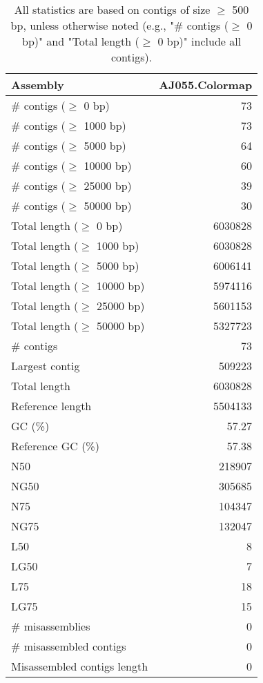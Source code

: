\documentclass[12pt,a4paper]{article}
\begin{document}
\begin{table}[ht]
\begin{center}
\caption{All statistics are based on contigs of size $\geq$ 500 bp, unless otherwise noted (e.g., "\# contigs ($\geq$ 0 bp)" and "Total length ($\geq$ 0 bp)" include all contigs).}
\begin{tabular}{|l*{1}{|r}|}
\hline
Assembly & AJ055.Colormap \\ \hline
\# contigs ($\geq$ 0 bp) & 73 \\ \hline
\# contigs ($\geq$ 1000 bp) & 73 \\ \hline
\# contigs ($\geq$ 5000 bp) & 64 \\ \hline
\# contigs ($\geq$ 10000 bp) & 60 \\ \hline
\# contigs ($\geq$ 25000 bp) & 39 \\ \hline
\# contigs ($\geq$ 50000 bp) & 30 \\ \hline
Total length ($\geq$ 0 bp) & 6030828 \\ \hline
Total length ($\geq$ 1000 bp) & 6030828 \\ \hline
Total length ($\geq$ 5000 bp) & 6006141 \\ \hline
Total length ($\geq$ 10000 bp) & 5974116 \\ \hline
Total length ($\geq$ 25000 bp) & 5601153 \\ \hline
Total length ($\geq$ 50000 bp) & 5327723 \\ \hline
\# contigs & 73 \\ \hline
Largest contig & 509223 \\ \hline
Total length & 6030828 \\ \hline
Reference length & 5504133 \\ \hline
GC (\%) & 57.27 \\ \hline
Reference GC (\%) & 57.38 \\ \hline
N50 & 218907 \\ \hline
NG50 & 305685 \\ \hline
N75 & 104347 \\ \hline
NG75 & 132047 \\ \hline
L50 & 8 \\ \hline
LG50 & 7 \\ \hline
L75 & 18 \\ \hline
LG75 & 15 \\ \hline
\# misassemblies & 0 \\ \hline
\# misassembled contigs & 0 \\ \hline
Misassembled contigs length & 0 \\ \hline

\end{tabular}
\end{center}
\end{table}
\end{document}
